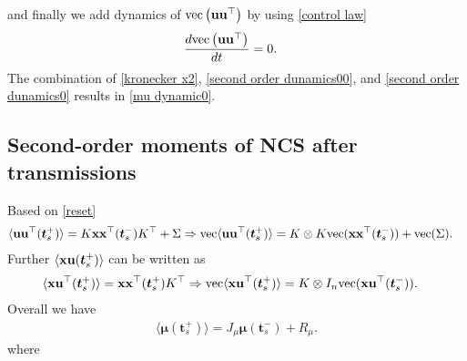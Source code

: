 \documentclass[letterpaper, 10 pt,one column, conference]{ieeeconf}  %
\begin{document}
and finally we add dynamics of ${\rm vec}  \left( \bold u  \bold u^\top \right)$ by using \eqref{control law}
\begin{equation}
\begin{aligned}
&\frac{d {\rm vec}  \left( \bold u  \bold u^\top \right) }{dt } =0.
\label{second order dunamics0}
\end{aligned}
\end{equation}
The combination of \eqref{kronecker x2}, \eqref{second order dunamics00}, and \eqref{second order dunamics0} results in \eqref{mu dynamic0}.

\subsection{Second-order moments of NCS after transmissions}
Based on \eqref{reset} 
\begin{equation}\begin{aligned}
\langle & \bold u \bold   u^\top (\boldsymbol{t}_s^+)\rangle =   K \bold x \bold x^\top (\boldsymbol{t}_s^-)  K^\top+ \Sigma \Rightarrow 
{\rm vec}  \langle \bold u \bold u^\top (\boldsymbol{t}_s^+)\rangle  = K \otimes K {\rm vec}  ( \bold x \bold x^\top (\boldsymbol{t}_s^-))+ {\rm vec}  (\Sigma).
\end{aligned}
\end{equation}
Further $\langle \bold x \bold u (\boldsymbol{t}_s^+)\rangle $ can be written as
\begin{equation}\begin{aligned}
\langle \bold x \bold u^\top (\boldsymbol{t}_s^+)\rangle & =   \bold x \bold x^\top (\boldsymbol{t}_s^+)  K^\top\Rightarrow 
 {\rm vec}  \langle \bold x \bold u^\top (\boldsymbol{t}_s^+)\rangle  = K \otimes I_n {\rm vec}  ( \bold x \bold u^\top (\boldsymbol{t}_s^-)).
\end{aligned}
\end{equation}
Overall we have
\begin{equation}
\begin{aligned}
\langle \boldsymbol \mu(\boldsymbol{t}_s^+)  \rangle =   J_\mu \boldsymbol \mu(\boldsymbol{t}_s^-) + R_\mu. \label{reset 20}
\end{aligned}
\end{equation}
where 
\end{document}
